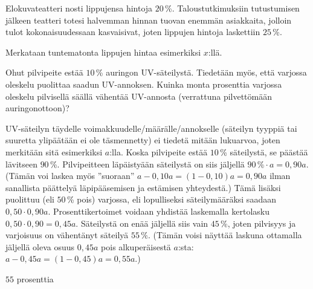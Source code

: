 \begin{esimerkki}
Elokuvateatteri nosti lippujensa hintoja $20$\,\%. Taloustutkimuksiin tutustumisen jälkeen teatteri totesi halvemman hinnan tuovan enemmän asiakkaita, jolloin tulot kokonaisuudessaan kasvaisivat, joten lippujen hintoja laskettiin $25$\,\%.
	\begin{esimratk}
	Merkataan tuntematonta lippujen hintaa esimerkiksi $x$:llä.
	\end{esimratk}
\end{esimerkki}

\begin{esimerkki}
Ohut pilvipeite estää $10$\,\% auringon UV-säteilystä. Tiedetään myös, että varjossa oleskelu puolittaa saadun UV-annoksen. Kuinka monta prosenttia varjossa oleskelu pilvisellä säällä vähentää UV-annosta (verrattuna pilvettömään auringonottoon)?
	\begin{esimratk}
UV-säteilyn täydelle voimakkuudelle/määrälle/annokselle (säteilyn tyyppiä tai suuretta ylipäätään ei ole täsmennetty) ei tiedetä mitään lukuarvoa, joten merkitään sitä esimerkiksi $a$:lla. Koska pilvipeite estää $10$\,\% säteilystä, se päästää lävitseen $90$\,\%.  Pilvipeitteen läpäistyään säteilystä on siis jäljellä $90\,\%\cdot a=0,90a$. (Tämän voi laskea myös ''suoraan'' $a-0,10a=(1-0,10)a=0,90a$ ilman sanallista päättelyä läpipääsemisen ja estämisen yhteydestä.) Tämä lisäksi puolittuu (eli $50$\,\% pois) varjossa, eli lopulliseksi säteilymääräksi saadaan $0,50\cdot 0,90a$. Prosenttikertoimet voidaan yhdistää laskemalla kertolasku $0,50\cdot 0,90=0,45a$. Säteilystä on enää jäljellä siis vain $45$\,\%, joten pilvisyys ja varjoisuus on vähentänyt säteilyä $55\,\%$. (Tämän voisi näyttää laskuna ottamalla jäljellä oleva osuus $0,45a$ pois alkuperäisestä $a$:sta: $a-0,45a=(1-0,45)a=0,55a$.)
	\end{esimratk}
	\begin{esimvast}
	$55$ prosenttia
	\end{esimvast}
\end{esimerkki}


